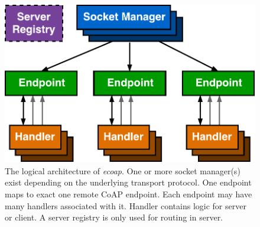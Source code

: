 \begin{figure}[!htbp]
\centering
\includegraphics[scale = 0.55]{ecoap_logic_arch}
\caption{The logical architecture of \textit{ecoap}. One or more socket manager(s) exist depending on the underlying transport protocol. One endpoint maps to exact one remote CoAP endpoint. Each endpoint may have many handlers associated with it. Handler contains logic for server or client. A server registry is only used for routing in server.}
\label{fig:ecoap_arch_logic}
\end{figure}

